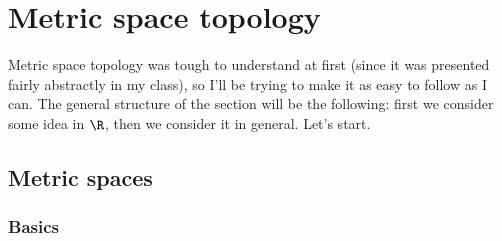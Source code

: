 \documentclass[class=article, crop=false]{standalone}
\begin{document}
\section{Metric space topology}

Metric space topology was tough to understand at first (since it was presented fairly abstractly in my class), so I'll be trying to make it as easy to follow as I can. The general structure of the section will be the following: first we consider some idea in $\R$, then we consider it in general. Let's start.

\subsection{Metric spaces}

\subsubsection*{Basics}
\end{document}
